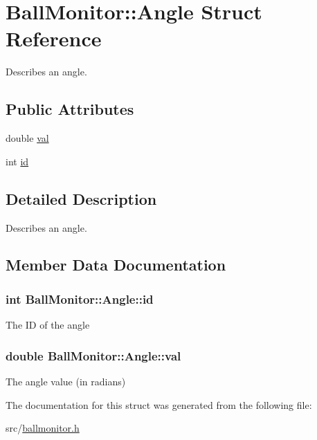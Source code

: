 \hypertarget{structBallMonitor_1_1Angle}{
\section{BallMonitor::Angle Struct Reference}
\label{structBallMonitor_1_1Angle}
}


Describes an angle.  


\subsection*{Public Attributes}
\begin{DoxyCompactItemize}
\item 
double \hyperlink{structBallMonitor_1_1Angle_a78fc53a17705399300e15527aa9797dc}{val}
\item 
int \hyperlink{structBallMonitor_1_1Angle_a8c4cf98ad8b22adcc0bf58bd575185bf}{id}
\end{DoxyCompactItemize}


\subsection{Detailed Description}
Describes an angle. 

\subsection{Member Data Documentation}
\hypertarget{structBallMonitor_1_1Angle_a8c4cf98ad8b22adcc0bf58bd575185bf}{
\subsubsection[{id}]{\setlength{\rightskip}{0pt plus 5cm}int {\bf BallMonitor::Angle::id}}}
\label{structBallMonitor_1_1Angle_a8c4cf98ad8b22adcc0bf58bd575185bf}
The ID of the angle \hypertarget{structBallMonitor_1_1Angle_a78fc53a17705399300e15527aa9797dc}{
\subsubsection[{val}]{\setlength{\rightskip}{0pt plus 5cm}double {\bf BallMonitor::Angle::val}}}
\label{structBallMonitor_1_1Angle_a78fc53a17705399300e15527aa9797dc}
The angle value (in radians) 

The documentation for this struct was generated from the following file:\begin{DoxyCompactItemize}
\item 
src/\hyperlink{ballmonitor_8h}{ballmonitor.h}\end{DoxyCompactItemize}
